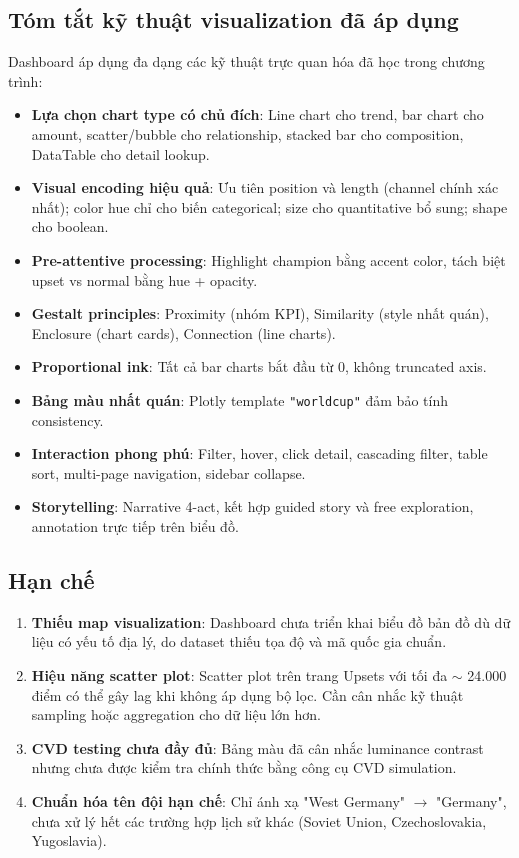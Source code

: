 \documentclass[12pt,a4paper]{article}
\begin{document}
\subsection{Tóm tắt kỹ thuật visualization đã áp dụng}
Dashboard áp dụng đa dạng các kỹ thuật trực quan hóa đã học trong chương trình:
\begin{itemize}
    \item \textbf{Lựa chọn chart type có chủ đích}: Line chart cho trend, bar chart cho amount, scatter/bubble cho relationship, stacked bar cho composition, DataTable cho detail lookup.
    \item \textbf{Visual encoding hiệu quả}: Ưu tiên position và length (channel chính xác nhất); color hue chỉ cho biến categorical; size cho quantitative bổ sung; shape cho boolean.
    \item \textbf{Pre-attentive processing}: Highlight champion bằng accent color, tách biệt upset vs normal bằng hue + opacity.
    \item \textbf{Gestalt principles}: Proximity (nhóm KPI), Similarity (style nhất quán), Enclosure (chart cards), Connection (line charts).
    \item \textbf{Proportional ink}: Tất cả bar charts bắt đầu từ 0, không truncated axis.
    \item \textbf{Bảng màu nhất quán}: Plotly template \texttt{"worldcup"} đảm bảo tính consistency.
    \item \textbf{Interaction phong phú}: Filter, hover, click detail, cascading filter, table sort, multi-page navigation, sidebar collapse.
    \item \textbf{Storytelling}: Narrative 4-act, kết hợp guided story và free exploration, annotation trực tiếp trên biểu đồ.
\end{itemize}

\subsection{Hạn chế}
\begin{enumerate}
    \item \textbf{Thiếu map visualization}: Dashboard chưa triển khai biểu đồ bản đồ dù dữ liệu có yếu tố địa lý, do dataset thiếu tọa độ và mã quốc gia chuẩn.
    \item \textbf{Hiệu năng scatter plot}: Scatter plot trên trang Upsets với tối đa $\sim$ 24.000 điểm có thể gây lag khi không áp dụng bộ lọc. Cần cân nhắc kỹ thuật sampling hoặc aggregation cho dữ liệu lớn hơn.
    \item \textbf{CVD testing chưa đầy đủ}: Bảng màu đã cân nhắc luminance contrast nhưng chưa được kiểm tra chính thức bằng công cụ CVD simulation.
    \item \textbf{Chuẩn hóa tên đội hạn chế}: Chỉ ánh xạ "West Germany" $\rightarrow$ "Germany", chưa xử lý hết các trường hợp lịch sử khác (Soviet Union, Czechoslovakia, Yugoslavia).
\end{enumerate}
\end{document}
